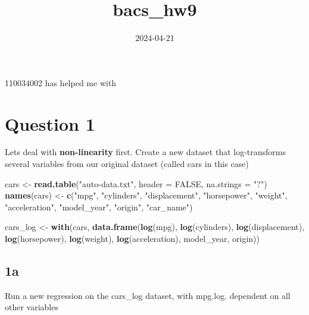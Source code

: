 \documentclass[
]{article}
\title{bacs\_hw9}
\author{}
\date{\vspace{-2.5em}2024-04-21}
\newenvironment{Shaded}{\begin{snugshade}}{\end{snugshade}}
\newcommand{\AttributeTok}[1]{\textcolor[rgb]{0.13,0.29,0.53}{#1}}
\newcommand{\ConstantTok}[1]{\textcolor[rgb]{0.56,0.35,0.01}{#1}}
\newcommand{\FunctionTok}[1]{\textcolor[rgb]{0.13,0.29,0.53}{\textbf{#1}}}
\newcommand{\NormalTok}[1]{#1}
\newcommand{\OtherTok}[1]{\textcolor[rgb]{0.56,0.35,0.01}{#1}}
\newcommand{\StringTok}[1]{\textcolor[rgb]{0.31,0.60,0.02}{#1}}
\begin{document}
\maketitle

110034002 has helped me with

\hypertarget{question-1}{%
\section{Question 1}\label{question-1}}

Let\textquotesingle s deal with \textbf{non-linearity} first. Create a
new dataset that log-transforms several variables from our original
dataset (called cars in this case)

\begin{Shaded}
\begin{Highlighting}[]
\NormalTok{cars }\OtherTok{\textless{}{-}} \FunctionTok{read.table}\NormalTok{(}\StringTok{"auto{-}data.txt"}\NormalTok{, }\AttributeTok{header =} \ConstantTok{FALSE}\NormalTok{, }\AttributeTok{na.strings =} \StringTok{"?"}\NormalTok{)}
\FunctionTok{names}\NormalTok{(cars) }\OtherTok{\textless{}{-}} \FunctionTok{c}\NormalTok{(}\StringTok{"mpg"}\NormalTok{, }\StringTok{"cylinders"}\NormalTok{, }\StringTok{"displacement"}\NormalTok{, }\StringTok{"horsepower"}\NormalTok{, }\StringTok{"weight"}\NormalTok{, }
                 \StringTok{"acceleration"}\NormalTok{, }\StringTok{"model\_year"}\NormalTok{, }\StringTok{"origin"}\NormalTok{, }\StringTok{"car\_name"}\NormalTok{)}

\NormalTok{cars\_log }\OtherTok{\textless{}{-}} \FunctionTok{with}\NormalTok{(cars, }\FunctionTok{data.frame}\NormalTok{(}\FunctionTok{log}\NormalTok{(mpg), }\FunctionTok{log}\NormalTok{(cylinders), }\FunctionTok{log}\NormalTok{(displacement), }
                                  \FunctionTok{log}\NormalTok{(horsepower), }\FunctionTok{log}\NormalTok{(weight), }\FunctionTok{log}\NormalTok{(acceleration), }
\NormalTok{                                  model\_year, origin))}
\end{Highlighting}
\end{Shaded}

\hypertarget{a}{%
\subsection{1a}\label{a}}

Run a new regression on the cars\_log dataset, with mpg.log. dependent
on all other variables
\end{document}
